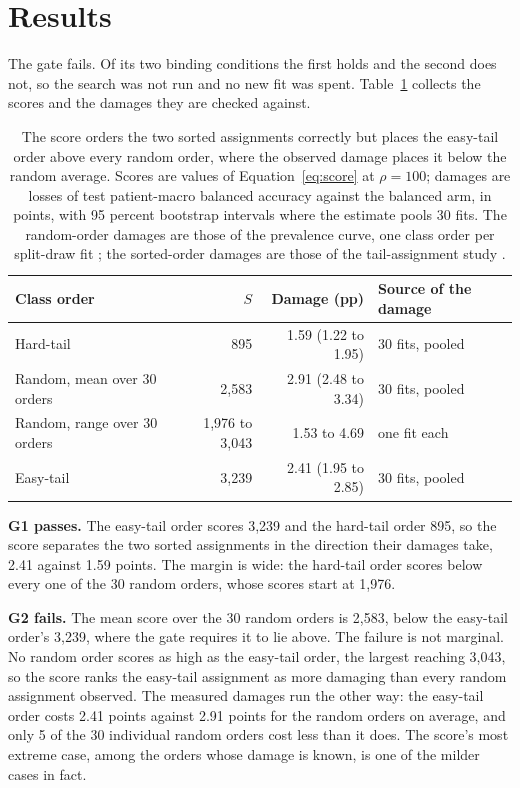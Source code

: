 \section{Results}
\label{sec:results}
The gate fails. Of its two binding conditions the first holds and the second does not, so the search was not run and no new fit was spent. Table~\ref{tab:gate} collects the scores and the damages they are checked against.

\begin{table}[htbp]
\centering
\small
\setlength{\tabcolsep}{6pt}
\renewcommand{\arraystretch}{1.08}
\begin{tabular}{@{}lrrl@{}}
\toprule
Class order & $S$ & Damage (pp) & Source of the damage \\
\midrule
Hard-tail & 895 & 1.59 \; (1.22 to 1.95) & 30 fits, pooled \\
Random, mean over 30 orders & 2,583 & 2.91 \; (2.48 to 3.34) & 30 fits, pooled \\
Random, range over 30 orders & 1,976 to 3,043 & 1.53 to 4.69 & one fit each \\
Easy-tail & 3,239 & 2.41 \; (1.95 to 2.85) & 30 fits, pooled \\
\bottomrule
\end{tabular}
\caption{The score orders the two sorted assignments correctly but places the easy-tail order above every random order, where the observed damage places it below the random average. Scores are values of Equation~\eqref{eq:score} at $\rho=100$; damages are losses of test patient-macro balanced accuracy against the balanced arm, in points, with 95 percent bootstrap intervals where the estimate pools 30 fits. The random-order damages are those of the prevalence curve, one class order per split-draw fit \citep{queisler2026prevalenceTcga}; the sorted-order damages are those of the tail-assignment study \citep{queisler2026tailTcga}.}
\label{tab:gate}
\end{table}

\noindent \textbf{G1 passes.} The easy-tail order scores 3,239 and the hard-tail order 895, so the score separates the two sorted assignments in the direction their damages take, 2.41 against 1.59 points. The margin is wide: the hard-tail order scores below every one of the 30 random orders, whose scores start at 1,976.

\noindent \textbf{G2 fails.} The mean score over the 30 random orders is 2,583, below the easy-tail order's 3,239, where the gate requires it to lie above. The failure is not marginal. No random order scores as high as the easy-tail order, the largest reaching 3,043, so the score ranks the easy-tail assignment as more damaging than every random assignment observed. The measured damages run the other way: the easy-tail order costs 2.41 points against 2.91 points for the random orders on average, and only 5 of the 30 individual random orders cost less than it does. The score's most extreme case, among the orders whose damage is known, is one of the milder cases in fact.

